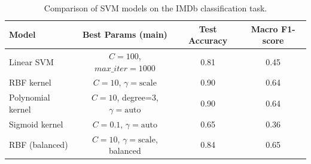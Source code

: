 \begin{table}[h]
\centering
\caption{Comparison of SVM models on the IMDb classification task.}
\label{tab:svm_results}
\begin{tabular}{lccc}
\hline
\textbf{Model} & \textbf{Best Params (main)} & \textbf{Test Accuracy} & \textbf{Macro F1-score} \\
\hline
Linear SVM & $C=100$, $max\_iter=1000$ & 0.81 & 0.45 \\
RBF kernel & $C=10$, $\gamma=\text{scale}$ & 0.90 & 0.64 \\
Polynomial kernel & $C=10$, degree=3, $\gamma=\text{auto}$ & 0.90 & 0.64 \\
Sigmoid kernel & $C=0.1$, $\gamma=\text{auto}$ & 0.65 & 0.36 \\
RBF (balanced) & $C=10$, $\gamma=\text{scale}$, balanced & 0.84 & 0.65 \\
\hline
\end{tabular}
\end{table}
    
